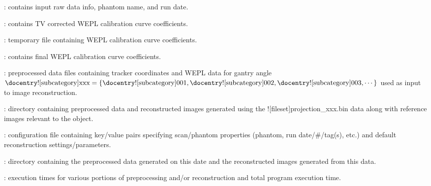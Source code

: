 \begin{tcbenvironment}
\begin{tcbenumbox}
\begin{ThinEnum}
\begin{ThinEnum}
\begin{ThinEnum}
\begin{ThinEnum}
\begin{ThinEnum}
\begin{ThinEnum}
                    \begin{ThinEnum}
                                \item {} : contains input raw data info, phantom name, and run date.
                                \item {} : contains TV corrected WEPL calibration curve coefficients.
                                \item {} : temporary file containing WEPL calibration curve coefficients.
                                    \item {} : contains final WEPL calibration curve coefficients.
                                \item {} : preprocessed data files containing tracker coordinates and WEPL data for gantry angle $\text{\docentry![subcategory]{xxx}} =\{\text{\docentry![subcategory]{001}}, \text{\docentry![subcategory]{002}}, \text{\docentry![subcategory]{003}}, \cdots\}$ used as input to image reconstruction.
                                \item {} : directory containing preprocessed data and reconstructed
                                        images generated using the \docentry![fileset]{projection\_xxx.bin} data along with reference images relevant to the object.
                                    \begin{ThinEnum}
                                        \item {} : configuration file containing key/value pairs specifying scan/phantom properties
                                    (phantom, run date/\#/tag(s), etc.) and default reconstruction settings/parameters.
                                    \item {} : directory containing the preprocessed data generated on this date and the reconstructed images generated from this data.
                                    \begin{ThinEnum}
                                            \item {} : execution times for various portions of preprocessing and/or reconstruction and total program execution time.

\end{ThinEnum}
\end{ThinEnum}
\end{ThinEnum}
\end{ThinEnum}
\end{ThinEnum}
\end{ThinEnum}
\end{ThinEnum}
\end{ThinEnum}
\end{ThinEnum}
\end{tcbenumbox}
\end{tcbenvironment}
